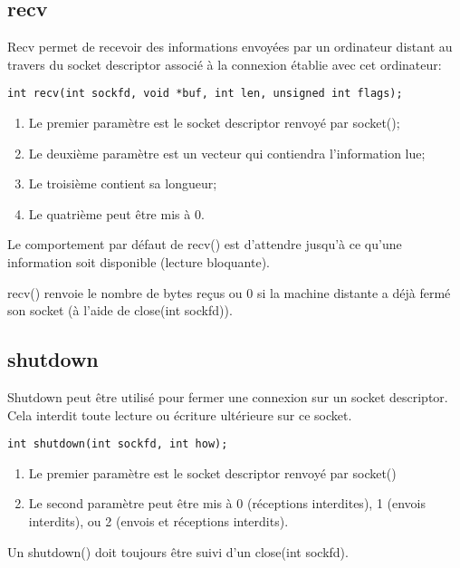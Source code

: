 \documentclass[a4paper]{article}
\begin{document}
\subsection{recv}
Recv permet de recevoir des informations envoyées par un ordinateur distant au travers du socket descriptor associé à la connexion établie avec cet ordinateur:
\begin{lstlisting}
int recv(int sockfd, void *buf, int len, unsigned int flags);
\end{lstlisting}
\begin{enumerate}
  \item Le premier paramètre est le socket descriptor renvoyé par socket();
  \item Le deuxième paramètre est un vecteur qui contiendra l'information lue;
  \item Le troisième contient sa longueur;
  \item Le quatrième peut être mis à 0.
\end{enumerate}
Le comportement par défaut de recv() est d'attendre jusqu'à ce qu'une information soit disponible (lecture bloquante).\par
recv() renvoie le nombre de bytes reçus ou 0 si la machine distante a déjà fermé son socket (à l'aide de close(int sockfd)).
\subsection{shutdown}
Shutdown peut être utilisé pour fermer une connexion sur un socket descriptor. Cela interdit toute lecture ou écriture ultérieure sur ce socket.
\begin{lstlisting}
int shutdown(int sockfd, int how);
\end{lstlisting}
\begin{enumerate}
  \item Le premier paramètre est le socket descriptor renvoyé par socket()
  \item Le second paramètre peut être mis à 0 (réceptions interdites), 1 (envois interdits), ou 2 (envois et réceptions interdits).
\end{enumerate}
Un shutdown() doit toujours être suivi d'un close(int sockfd).
\end{document}

